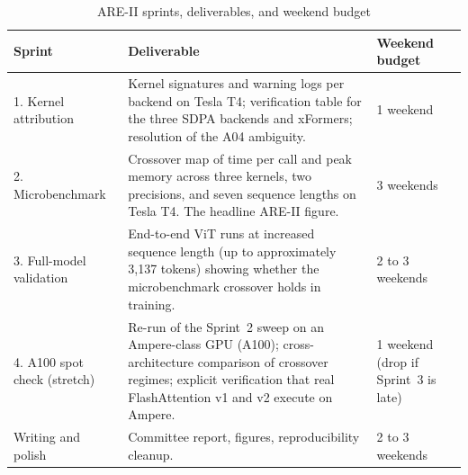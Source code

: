 \documentclass[11pt]{article}
\begin{document}
\begin{table}[h!]
\centering
\caption{ARE-II sprints, deliverables, and weekend budget}
\label{tab:areii-sprints}
\small
\begin{tabularx}{\textwidth}{l X p{2.8cm}}
\toprule
\textbf{Sprint} & \textbf{Deliverable} & \textbf{Weekend budget} \\
\midrule
1. Kernel attribution & Kernel signatures and warning logs per backend on Tesla T4; verification table for the three SDPA backends and xFormers; resolution of the A04 ambiguity. & 1 weekend \\
2. Microbenchmark & Crossover map of time per call and peak memory across three kernels, two precisions, and seven sequence lengths on Tesla T4. The headline ARE-II figure. & 3 weekends \\
3. Full-model validation & End-to-end ViT runs at increased sequence length (up to approximately 3{,}137 tokens) showing whether the microbenchmark crossover holds in training. & 2 to 3 weekends \\
4. A100 spot check (stretch) & Re-run of the Sprint~2 sweep on an Ampere-class GPU (A100); cross-architecture comparison of crossover regimes; explicit verification that real FlashAttention v1 and v2 execute on Ampere. & 1 weekend (drop if Sprint~3 is late) \\
\midrule
Writing and polish & Committee report, figures, reproducibility cleanup. & 2 to 3 weekends \\
\bottomrule
\end{tabularx}
\end{table}
\end{document}
